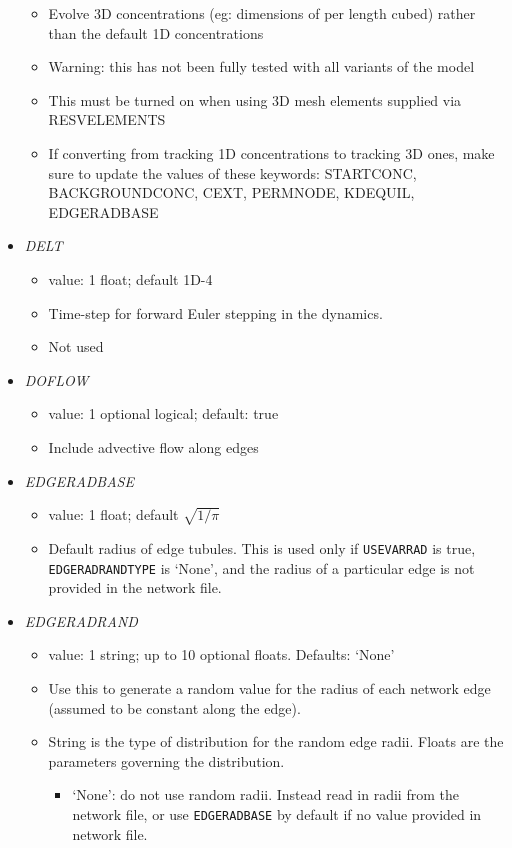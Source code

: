 \documentclass[12pt]{article}
\begin{document}
\begin{itemize}
\begin{itemize}
	\item Evolve 3D concentrations (eg: dimensions of per length cubed) rather than the default 1D concentrations
	\item {\color{red} Warning: } this has not been fully tested with all variants of the model
	\item This must be turned on when using 3D mesh elements supplied via RESVELEMENTS
	\item If converting from tracking 1D concentrations to tracking 3D ones, make sure to update the values of these keywords: STARTCONC, BACKGROUNDCONC, CEXT, PERMNODE, KDEQUIL, EDGERADBASE
\end{itemize}
%
\item {\it DELT}
    \begin{itemize}
      \item  value: 1 float; default 1D-4
      \item Time-step for forward Euler stepping in the dynamics. 
      \item Not used
    \end{itemize}
%
\item {\it DOFLOW}
\begin{itemize}
	\item  value: 1 optional logical; default: true 
	\item Include advective flow along edges
\end{itemize}
%
\item {\it EDGERADBASE}
\begin{itemize}
	\item  value: 1 float; default $\sqrt{1/\pi}$
	\item Default radius of edge tubules. This is used only if \verb=USEVARRAD= is true, \verb=EDGERADRANDTYPE= is `None', and the radius of a particular edge is not provided in the network file.
\end{itemize}
%
\item {\it EDGERADRAND}
\begin{itemize}
	\item  value: 1 string; up to 10 optional floats. Defaults: `None'
	\item Use this to generate a random value for the radius of each network edge (assumed to be constant along the edge). 
	\item String is the type of distribution for the random edge radii. Floats are the parameters governing the distribution.
	\begin{itemize}
		\item `None': do not use random radii. Instead read in radii from the network file, or use \verb=EDGERADBASE= by default if no value provided in network file.

\end{itemize}
\end{itemize}
\end{itemize}
\end{document}
